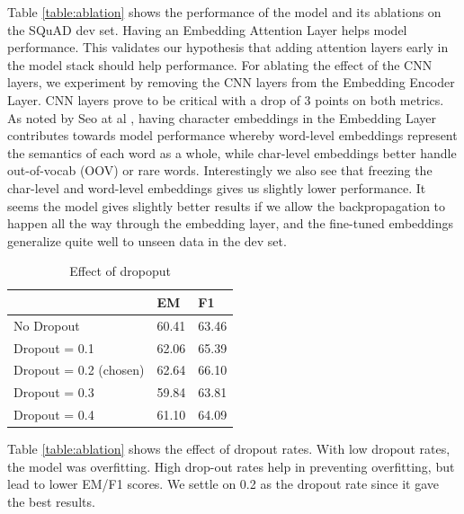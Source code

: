 Table \ref{table:ablation} shows the performance of the model and its ablations on the SQuAD dev set. Having an Embedding Attention Layer helps model performance. This validates our hypothesis that adding attention layers early in the model stack should help performance. For ablating the effect of the CNN layers, we experiment by removing the CNN layers from the Embedding Encoder Layer. CNN layers prove to be critical with a drop of 3 points on both metrics. As noted by Seo at al \cite{seo2016bidirectional}, having character embeddings in the Embedding Layer contributes towards model performance whereby word-level embeddings represent the semantics of each word as a whole, while char-level embeddings better handle out-of-vocab (OOV) or rare words. Interestingly we also see that freezing the char-level and word-level embeddings gives us slightly lower performance. It seems the model gives slightly better results if we allow the backpropagation to happen all the way through the embedding layer, and the fine-tuned embeddings generalize quite well to unseen data in the dev set. 

\begin{table}[]
\caption{Effect of dropoput}
\label{table:dropoutresults}
\centering
\begin{tabular}{lll}
																	& EM    & F1    \\ \hline
No Dropout		   									& 60.41 & 63.46 \\
Dropout = 0.1    									& 62.06 & 65.39 \\ 
Dropout = 0.2 (chosen)		  			& 62.64 & 66.10 \\ 
Dropout = 0.3    									& 59.84 & 63.81 \\ 
Dropout = 0.4    									& 61.10 & 64.09 \\ \hline

\end{tabular}
\end{table}

Table \ref{table:ablation} shows the effect of dropout rates. With low dropout rates, the model was overfitting.  High drop-out rates help in preventing overfitting, but lead to lower EM/F1 scores. We settle on 0.2 as the dropout rate since it gave the best results.


